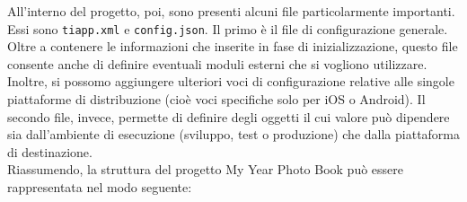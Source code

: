 				All'interno del progetto, poi, sono presenti alcuni file particolarmente importanti. Essi sono \texttt{tiapp.xml} e
				\texttt{config.json}. Il primo è il file di configurazione generale. Oltre a contenere le informazioni che inserite
				in fase di inizializzazione, questo file consente anche di definire eventuali moduli esterni che si vogliono
				utilizzare. Inoltre, si possomo aggiungere ulteriori voci di configurazione relative alle singole piattaforme di
				distribuzione (cioè voci specifiche solo per iOS o Android). Il secondo file, invece, permette di definire degli
				oggetti il cui valore può dipendere sia dall'ambiente di esecuzione (sviluppo, test o produzione) che dalla
				piattaforma di destinazione.\\
				Riassumendo, la struttura del progetto My Year Photo Book può essere rappresentata nel modo seguente:
